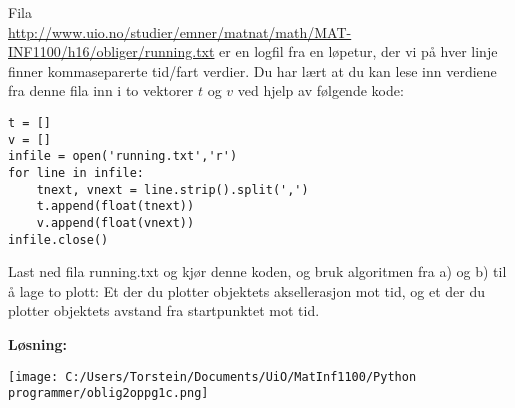 \documentclass[11pt,norsk]{article}
\begin{document}
				\begin{flushleft}
Fila \\ \href{http://www.uio.no/studier/emner/matnat/math/MAT-INF1100/h16/obliger/running.txt}{http://www.uio.no/studier/emner/matnat/math/MAT-INF1100/h16/obliger/running.txt} er en logfil fra en løpetur, der vi på hver linje finner kommaseparerte tid/fart verdier. Du har lært at du kan lese inn verdiene fra denne fila inn i to vektorer $t$ og $v$ ved hjelp av følgende kode:
					\begin{lstlisting}[frame=single]
t = []
v = []
infile = open('running.txt','r')
for line in infile:
	tnext, vnext = line.strip().split(',')
	t.append(float(tnext))
	v.append(float(vnext))
infile.close()
					\end{lstlisting}
Last ned fila running.txt og kjør denne koden, og bruk algoritmen fra a) og b) til å lage to plott: Et der du plotter objektets aksellerasjon mot tid, og et der du plotter objektets avstand fra startpunktet mot tid.
				\end{flushleft}
				\begin{flushleft}
\textbf{Løsning:}
				\end{flushleft}

\flushleft \texttt{[image: C:/Users/Torstein/Documents/UiO/MatInf1100/Python programmer/oblig2oppg1c.png]}
\end{document}
